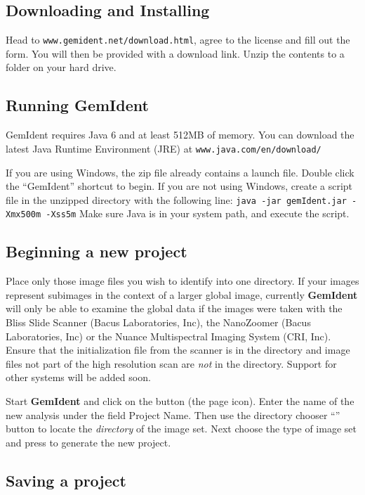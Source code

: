 \documentclass[12pt]{article}
\begin{document}
\subsection{Downloading and Installing}

Head to {\tt www.gemident.net/download.html}, agree to the license and fill out the form. You will then be provided with a download link. Unzip the contents to a folder on your hard drive.

\subsection{Running GemIdent}

GemIdent requires Java 6 and at least 512MB of memory. You can download the latest Java Runtime Environment (JRE) at {\tt www.java.com/en/download/}

If you are using Windows, the zip file already contains a launch file. Double click the ``GemIdent'' shortcut to begin. If you are not using Windows, create a script file in the unzipped directory with the following line: {\tt java -jar gemIdent.jar -Xmx500m -Xss5m} Make sure Java is in your system path, and execute the script.

\subsection{Beginning a new project\label{new}}

Place only those image files you wish to identify into one directory. If your images represent subimages in the context of a larger global image, currently {\bf GemIdent} will only be able to examine the global data if the images were taken with the Bliss Slide Scanner (Bacus Laboratories, Inc), the NanoZoomer (Bacus Laboratories, Inc) or the Nuance Multispectral Imaging System (CRI, Inc). Ensure that the initialization file from the scanner is in the directory and image files not part of the high resolution scan are {\emph{not}} in the directory. Support for other systems will be added soon.

Start {\bf GemIdent} and click on the  button (the page icon). Enter the name of the new analysis under the field {\sf Project Name.} Then use the directory chooser ``'' button to locate the {\emph{directory}} of the image set. Next choose the type of image set and press  to generate the new project.

\subsection{Saving a project}
\end{document}

